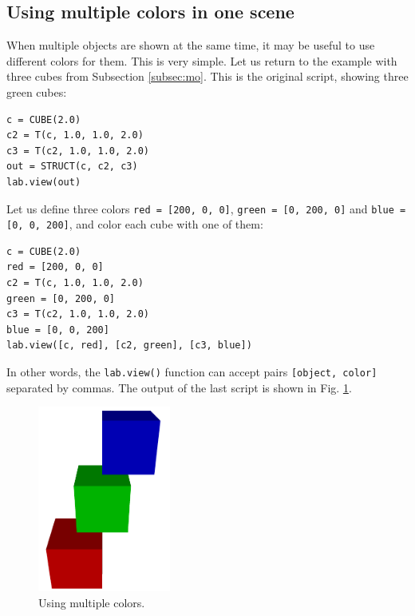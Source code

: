 \subsection{Using multiple colors in one scene} \label{subsec:multicolor}

When multiple objects are shown at the same time, it may be useful
to use different colors for them.
This is very simple. Let us return to the example with three cubes 
from Subsection \ref{subsec:mo}. This is the original script,
showing three green cubes:\\

\begin{bbox}
\begin{verbatim}
c = CUBE(2.0)
c2 = T(c, 1.0, 1.0, 2.0)
c3 = T(c2, 1.0, 1.0, 2.0)
out = STRUCT(c, c2, c3)
lab.view(out)
\end{verbatim}
\end{bbox}
\vspace{6mm}

\noindent
Let us define three colors {\tt red = [200, 0, 0]}, {\tt green = [0, 200, 0]}
and {\tt blue = [0, 0, 200]}, and color each cube with one of them:\\

\begin{bbox}
\begin{verbatim}
c = CUBE(2.0)
red = [200, 0, 0]
c2 = T(c, 1.0, 1.0, 2.0)
green = [0, 200, 0]
c3 = T(c2, 1.0, 1.0, 2.0)
blue = [0, 0, 200]
lab.view([c, red], [c2, green], [c3, blue])
\end{verbatim}
\end{bbox}
\noindent
\vspace{6mm}

\noindent
In other words, the {\tt lab.view()} function can accept pairs {\tt [object, color]} separated
by commas. The output of the last script is shown in Fig. \ref{fig:comp-1k}.

\begin{figure}[!ht]
\begin{center}
\includegraphics[width=0.39\textwidth]{img/multicolor-1.png}
\end{center}
\vspace{-4mm}
\caption{Using multiple colors.}
\label{fig:comp-1k}
\end{figure}



